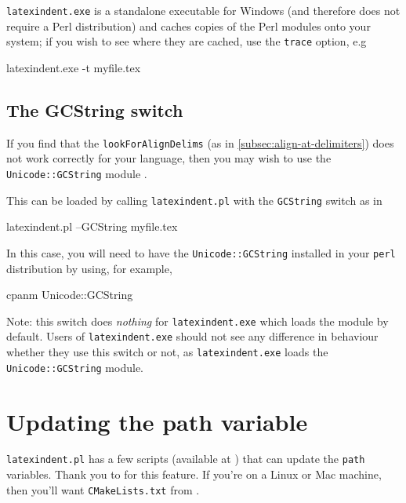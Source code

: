  \texttt{latexindent.exe} is a standalone executable
  for Windows (and therefore does not require a Perl distribution) and caches copies of the
  Perl modules onto your system; if you wish to see where they are cached, use the
  \texttt{trace} option, e.g
  \begin{dosprompt}
latexindent.exe -t myfile.tex
 \end{dosprompt}

 \subsection{The GCString switch}\label{subsec:the-GCString}
  If you find that the \texttt{lookForAlignDelims} (as in \cref{subsec:align-at-delimiters}) does not work correctly
  for your language, then you may wish to use the \texttt{Unicode::GCString} module .

  This can be loaded by calling \texttt{latexindent.pl} with the \texttt{GCString} switch
  as in

  \begin{commandshell}
latexindent.pl --GCString myfile.tex
\end{commandshell}

  In this case, you will need to have the \texttt{Unicode::GCString} installed in your
  \texttt{perl} distribution by using, for example,

  \begin{commandshell}
cpanm Unicode::GCString
\end{commandshell}

  Note: this switch does \emph{nothing} for \texttt{latexindent.exe} which loads the module
  by default. Users of \texttt{latexindent.exe} should not see any difference in behaviour
  whether they use this switch or not, as \texttt{latexindent.exe} loads the
  \texttt{Unicode::GCString} module.

 \section{Updating the path variable}\label{sec:updating-path}
  \texttt{latexindent.pl} has a few scripts (available at \cite{latexindent-home}) that can
  update the \texttt{path} variables. Thank you to \cite{jasjuang} for this feature. If
  you're on a Linux or Mac machine, then you'll want \texttt{CMakeLists.txt} from
  \cite{latexindent-home}.
